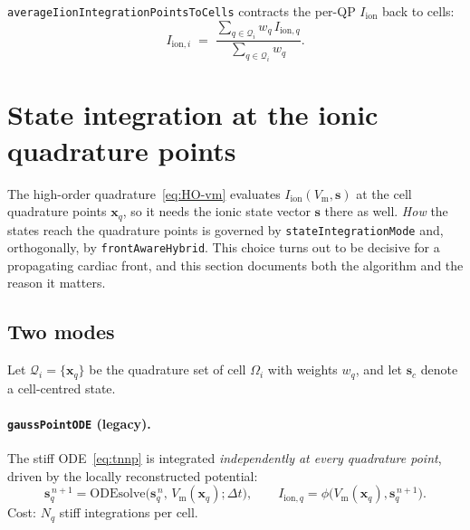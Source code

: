 \documentclass[11pt,a4paper]{article}
\newcommand{\code}[1]{\texttt{\small #1}}
\newcommand{\Vm}{V_{\text{m}}}
\newcommand{\Iion}{I_{\mathrm{ion}}}
\newcommand{\Iionsub}[1]{I_{\mathrm{ion},#1}}
\newcommand{\dictkey}[1]{\textcolor{black!60!green}{\texttt{\footnotesize #1}}}
\begin{document}
\code{averageIionIntegrationPointsToCells} contracts the per-QP $\Iion$
back to cells:
\begin{equation}
  \Iionsub{i} \;=\;
   \frac{\sum_{q \in \mathcal{Q}_{i}} w_{q}\, \Iionsub{q}}
        {\sum_{q \in \mathcal{Q}_{i}} w_{q}}.
\end{equation}

\section{State integration at the ionic quadrature points}
\label{sec:stateint}

The high-order quadrature~\eqref{eq:HO-vm} evaluates $\Iion(\Vm,\mathbf{s})$
at the cell quadrature points $\mathbf{x}_q$, so it needs the ionic state
vector $\mathbf{s}$ there as well. \emph{How} the states reach the quadrature
points is governed by \dictkey{stateIntegrationMode} and, orthogonally, by
\dictkey{frontAwareHybrid}. This choice turns out to be decisive for a
propagating cardiac front, and this section documents both the algorithm and
the reason it matters.

\subsection{Two modes}

Let $\mathcal{Q}_i=\{\mathbf{x}_q\}$ be the quadrature set of cell $\Omega_i$
with weights $w_q$, and let $\mathbf{s}_c$ denote a cell-centred state.

\paragraph{\code{gaussPointODE} (legacy).}
The stiff ODE~\eqref{eq:tnnp} is integrated \emph{independently at every
quadrature point}, driven by the locally reconstructed potential:
\begin{equation}
  \mathbf{s}_q^{\,n+1}
   = \mathrm{ODEsolve}\!\bigl(\mathbf{s}_q^{\,n},\,\Vm(\mathbf{x}_q);\Delta t\bigr),
  \qquad
  \Iionsub{q}=\phi\bigl(\Vm(\mathbf{x}_q),\mathbf{s}_q^{\,n+1}\bigr).
  \label{eq:gpode}
\end{equation}
Cost: $N_q$ stiff integrations per cell.
\end{document}
